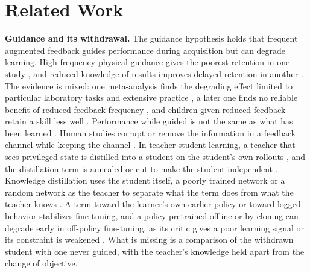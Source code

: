 \documentclass[journal]{IEEEtran}
\begin{document}
\section{Related Work}

\textbf{Guidance and its withdrawal.} The guidance hypothesis
\cite{salmoni1984,schmidt1989,schmidt1992} holds that frequent augmented
feedback guides performance during acquisition but can degrade learning.
High-frequency physical guidance gives the poorest retention in one study
\cite{winstein1994}, and reduced knowledge of results improves delayed
retention in another \cite{winstein1990}. The evidence is mixed: one
meta-analysis finds the degrading effect limited to particular laboratory
tasks and extensive practice \cite{marschall2007}, a later one
finds no reliable benefit of reduced feedback frequency \cite{mckay2022}, and
children given reduced feedback retain a skill less well \cite{sullivan2008}. Performance
while guided is not the same as what has been learned
\cite{schmidt1992,soderstrom2015}. Human studies corrupt or remove the
information in a feedback channel while keeping the channel
\cite{buekers1992,kitago2013,ploettner2025}. In teacher-student learning, a
teacher that sees privileged state is distilled into a student on the
student's own rollouts \cite{chen2019lbc,lee2020,miki2022,kumar2021}, and the
distillation term is annealed or cut to make the student independent
\cite{schmitt2018,agarwal2022}. Knowledge distillation uses the student
itself, a poorly trained network or a random network as the teacher to separate what the term does from what the
teacher knows \cite{yuan2020,sarnthein2023}. A term toward the learner's own
earlier policy \cite{li2023proto,luo2023} or toward logged behavior
\cite{zhao2022} stabilizes fine-tuning, and a policy pretrained offline or by
cloning can degrade early in off-policy fine-tuning, as its critic gives a poor
learning signal or its constraint is weakened
\cite{nair2020,uchendu2023,zhang2023}. What is missing is
a comparison of the withdrawn student with one never guided, with the teacher's
knowledge held apart from the change of objective.
\end{document}
